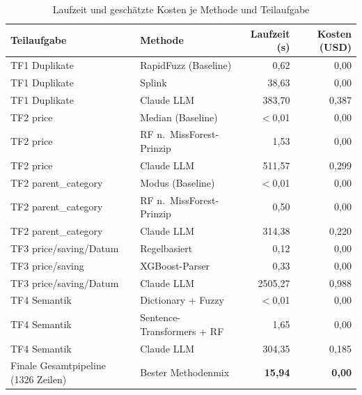 \begin{table}[htbp]
\centering
\caption{Laufzeit und geschätzte Kosten je Methode und Teilaufgabe}
\label{tab:laufzeit-kosten}
\begin{tabularx}{\textwidth}{Xlrr}
\toprule
\rowcolor{headerblue}
\textbf{Teilaufgabe} & \textbf{Methode} & \textbf{Laufzeit (s)} & \textbf{Kosten (USD)} \\
\midrule
\rowcolor{lightgray}
TF1 Duplikate & RapidFuzz (Baseline) & 0{,}62 & 0{,}00 \\
TF1 Duplikate & Splink & 38{,}63 & 0{,}00 \\
\rowcolor{lightgray}
TF1 Duplikate & Claude LLM & 383{,}70 & 0{,}387 \\
TF2 price & Median (Baseline) & $<$0{,}01 & 0{,}00 \\
\rowcolor{lightgray}
TF2 price & RF n.\ MissForest-Prinzip & 1{,}53 & 0{,}00 \\
TF2 price & Claude LLM & 511{,}57 & 0{,}299 \\
\rowcolor{lightgray}
TF2 parent\_category & Modus (Baseline) & $<$0{,}01 & 0{,}00 \\
TF2 parent\_category & RF n.\ MissForest-Prinzip & 0{,}50 & 0{,}00 \\
\rowcolor{lightgray}
TF2 parent\_category & Claude LLM & 314{,}38 & 0{,}220 \\
TF3 price/saving/Datum & Regelbasiert & 0{,}12 & 0{,}00 \\
\rowcolor{lightgray}
TF3 price/saving & XGBoost-Parser & 0{,}33 & 0{,}00 \\
TF3 price/saving/Datum & Claude LLM & 2505{,}27 & 0{,}988 \\
\rowcolor{lightgray}
TF4 Semantik & Dictionary + Fuzzy & $<$0{,}01 & 0{,}00 \\
TF4 Semantik & Sentence-Transformers + RF & 1{,}65 & 0{,}00 \\
\rowcolor{lightgray}
TF4 Semantik & Claude LLM & 304{,}35 & 0{,}185 \\
\midrule
Finale Gesamtpipeline (1326 Zeilen) & Bester Methodenmix & \textbf{15{,}94} & \textbf{0{,}00} \\
\bottomrule
\end{tabularx}
\end{table}

